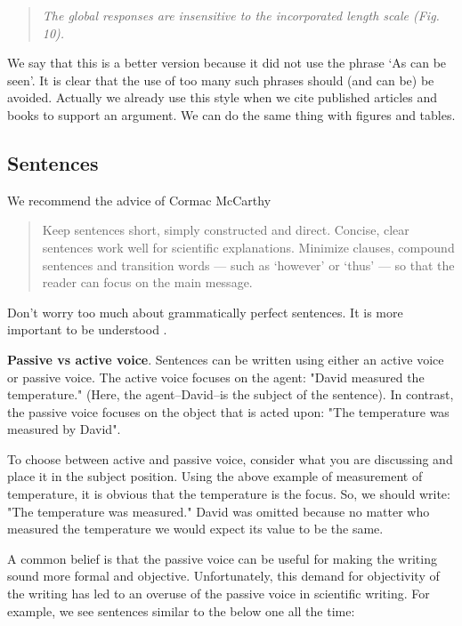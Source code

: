 \documentclass[authoryear,12pta4paper,fleqn]{article}
\numberwithin{equation}{section}
\theoremstyle{remark}
\begin{document}
 \begin{quote}
  \textit{The global responses are insensitive to the incorporated length scale (Fig. 10).}
 \end{quote}
We say that this is a better version because it did not use the phrase `As can be seen'. It is clear that the use of too many such phrases should (and can be) be avoided. 
Actually we already use this style when we cite published articles and books to support an argument. We can do the same thing with figures and tables.

\subsection{Sentences}\label{sec:sentences}

We recommend the advice of Cormac McCarthy \citep{McCarthy}

\begin{quote}
Keep sentences short, simply constructed and direct. Concise, clear sentences work well for scientific explanations. Minimize clauses, compound sentences and transition words — such as ‘however’ or ‘thus’ — so that the reader can focus on the main message.
\end{quote}
Don't worry too much about grammatically perfect sentences. It is more important to be understood \citep{McCarthy}. 


\noindent\textbf{Passive vs active voice}.     Sentences can be written using either an active voice  or passive voice. The active voice focuses on the agent: "David measured the temperature." (Here, the agent--David--is the subject of the sentence). In contrast, the passive voice focuses on the object that is acted upon: "The temperature was measured by David". 

To choose between active and passive voice, consider what you are discussing and place it in the subject position. Using the above example of measurement of temperature, it is obvious that the temperature is the focus. So, we should write: "The temperature was measured." David was omitted because no matter who measured the temperature we would expect its value to be the same. 

 A common belief is that the passive voice can be useful for making the writing sound more formal and objective. 
Unfortunately, this demand for objectivity of the writing has led to an overuse of the passive voice in scientific writing. For example, we see  sentences similar to the below one all the time:
\end{document}
